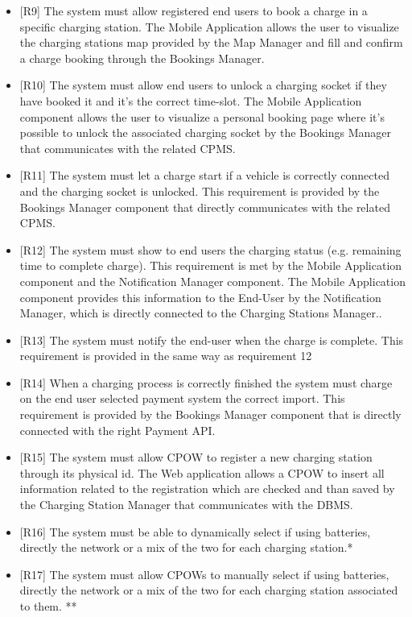 \documentclass[a4paper]{report}
\begin{document}
\begin{itemize}
    \item{[R9]} \label{R9} The system must allow registered end users to book a charge in a specific charging station. The Mobile Application allows the user to visualize the charging stations map provided by the Map Manager and fill and confirm a charge booking through the Bookings Manager.
    \item{[R10]} \label{R10} The system must allow end users to unlock a charging socket if they have booked it and it's the correct time-slot. The Mobile Application component allows the user to visualize a personal booking page where it's possible to unlock the associated charging socket by the Bookings Manager that communicates with the related CPMS.
    \item{[R11]} \label{R11} The system must let a charge start if a vehicle is correctly connected and the charging socket is unlocked. This requirement is provided by the Bookings Manager component that directly communicates with the related CPMS.
    \item{[R12]} \label{R12} The system must show to end users the charging status (e.g. remaining time to complete charge). This requirement is met by the Mobile Application component and the Notification Manager component. The Mobile Application component provides this information to the  End-User by the Notification Manager, which is directly connected to the Charging Stations Manager..
    \item{[R13]} \label{R13} The system must notify the end-user when the charge is complete. This requirement is provided in the same way as requirement 12
    \item{[R14]} \label{R14} When a charging process is correctly finished the system must charge on the end user selected payment system the correct import. This requirement is provided by the Bookings Manager component that is directly connected with the right Payment API.
    \item{[R15]} \label{R15} The system must allow CPOW to register a new charging station through its physical id. The Web application allows a CPOW to insert all information related to the registration which are checked and than saved by the Charging Station Manager that communicates with the DBMS.
    \item{[R16]} \label{R16} The system must be able to dynamically select if using batteries, directly the network or a mix of the two for each charging station.*
    \item{[R17]} \label{R17} The system must allow CPOWs to manually select if using batteries, directly the network or a mix of the two for each charging station associated to them. **

\end{itemize}
\end{document}
